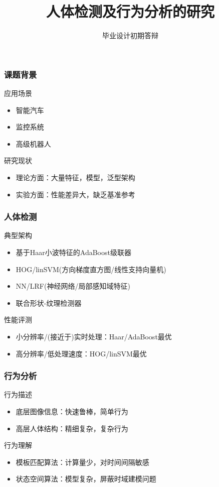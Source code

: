\documentclass[12pt]{beamer}
\title{人体检测及行为分析的研究}
\author{毕业设计初期答辩}
\date{}
\begin{document}
\begin{frame}
\titlepage
\end{frame}

\begin{frame}
\frametitle{课题背景}
\begin{block}{应用场景}
\begin{itemize}
\item 智能汽车
\item 监控系统
\item 高级机器人
\end{itemize}
\end{block}
\begin{block}{研究现状}
\begin{itemize}
\item 理论方面：大量特征，模型，泛型架构
\item 实验方面：性能差异大，缺乏基准参考
\end{itemize}
\end{block}
\end{frame}

\begin{frame}
\frametitle{人体检测}
\begin{block}{典型架构}
\begin{itemize}
\item 基于Haar小波特征的AdaBoost级联器
\item HOG/linSVM(方向梯度直方图/线性支持向量机)
\item NN/LRF(神经网络/局部感知域特征)
\item 联合形状-纹理检测器
\end{itemize}
\end{block}
\begin{block}{性能评测}
\begin{itemize}
\item 小分辨率/(接近于)实时处理：Haar/AdaBoost最优
\item 高分辨率/低处理速度：HOG/linSVM最优
\end{itemize}
\end{block}
\end{frame}

\begin{frame}
\frametitle{行为分析}
\begin{block}{行为描述}
\begin{itemize}
\item 底层图像信息：快速鲁棒，简单行为
\item 高层人体结构：精细复杂，复杂行为
\end{itemize}
\end{block}
\begin{block}{行为理解}
\begin{itemize}
\item 模板匹配算法：计算量少，对时间间隔敏感
\item 状态空间算法：模型复杂，屏蔽时域建模问题
\end{itemize}
\end{block}
\end{frame}
\end{document}
